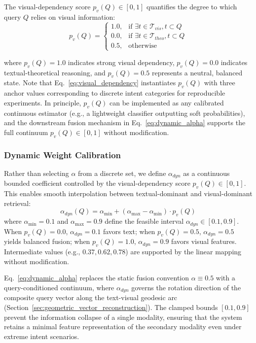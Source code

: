 \documentclass[a4paper, fleqn]{cas-dc}
\begin{document}
The visual-dependency score $p_v(Q) \in [0, 1]$ quantifies the degree to which query $Q$ relies on visual information:
\begin{equation}
p_v(Q) =
\begin{cases}
1.0, & \text{if } \exists t \in \mathcal{T}_{vis}, t \subset Q \\
0.0, & \text{if } \exists t \in \mathcal{T}_{theo}, t \subset Q \\
0.5, & \text{otherwise}
\end{cases}
\label{eq:visual_dependency}
\end{equation}

where $p_v(Q) = 1.0$ indicates strong visual dependency, $p_v(Q) = 0.0$ indicates textual-theoretical reasoning, and $p_v(Q) = 0.5$ represents a neutral, balanced state. Note that Eq.~\eqref{eq:visual_dependency} instantiates $p_v(Q)$ with three anchor values corresponding to discrete intent categories for reproducible experiments. In principle, $p_v(Q)$ can be implemented as any calibrated continuous estimator (e.g., a lightweight classifier outputting soft probabilities), and the downstream fusion mechanism in Eq.~\eqref{eq:dynamic_alpha} supports the full continuum $p_v(Q) \in [0, 1]$ without modification.
\subsubsection{Dynamic Weight Calibration}\label{sec:dynamic_weight_calibration}

Rather than selecting $\alpha$ from a discrete set, we define $\alpha_{dyn}$ as a continuous bounded coefficient controlled by the visual-dependency score $p_v(Q) \in [0, 1]$. This enables smooth interpolation between textual-dominant and visual-dominant retrieval:
\begin{equation}
\alpha_{dyn}(Q) = \alpha_{\min} + (\alpha_{\max} - \alpha_{\min}) \cdot p_v(Q)
\label{eq:dynamic_alpha}
\end{equation}
where $\alpha_{\min} = 0.1$ and $\alpha_{\max} = 0.9$ define the feasible interval $\alpha_{dyn} \in [0.1, 0.9]$. When $p_v(Q) = 0.0$, $\alpha_{dyn} = 0.1$ favors text; when $p_v(Q) = 0.5$, $\alpha_{dyn} = 0.5$ yields balanced fusion; when $p_v(Q) = 1.0$, $\alpha_{dyn} = 0.9$ favors visual features. Intermediate values (e.g., $0.37, 0.62, 0.78$) are supported by the linear mapping without modification.

Eq.~\eqref{eq:dynamic_alpha} replaces the static fusion convention $\alpha \equiv 0.5$ with a query-conditioned continuum, where $\alpha_{dyn}$ governs the rotation direction of the composite query vector along the text-visual geodesic arc (Section~\ref{sec:geometric_vector_reconstruction}). The clamped bounds $[0.1, 0.9]$ prevent the information collapse of a single modality, ensuring that the system retains a minimal feature representation of the secondary modality even under extreme intent scenarios.
\end{document}
